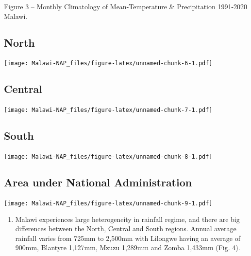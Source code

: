 \documentclass[
]{book}
\providecommand{\tightlist}{%
  \setlength{\itemsep}{0pt}\setlength{\parskip}{0pt}}
\begin{document}
Figure 3 -- Monthly Climatology of Mean-Temperature \& Precipitation 1991-2020 Malawi.

\hypertarget{north}{%
\subsection{North}\label{north}}

\texttt{[image: Malawi-NAP\_files/figure-latex/unnamed-chunk-6-1.pdf]}

\hypertarget{central}{%
\subsection{Central}\label{central}}

\texttt{[image: Malawi-NAP\_files/figure-latex/unnamed-chunk-7-1.pdf]}

\hypertarget{south}{%
\subsection{South}\label{south}}

\texttt{[image: Malawi-NAP\_files/figure-latex/unnamed-chunk-8-1.pdf]}

\hypertarget{area-under-national-administration}{%
\subsection{Area under National Administration}\label{area-under-national-administration}}

\texttt{[image: Malawi-NAP\_files/figure-latex/unnamed-chunk-9-1.pdf]}

\begin{enumerate}
\def\labelenumi{\arabic{enumi}.}
\setcounter{enumi}{18}
\tightlist
\item
  Malawi experiences large heterogeneity in rainfall regime, and there are big differences between the North, Central and South regions. Annual average rainfall varies from 725mm to 2,500mm with Lilongwe having an average of 900mm, Blantyre 1,127mm, Mzuzu 1,289mm and Zomba 1,433mm (Fig. 4).
\end{enumerate}
\end{document}
